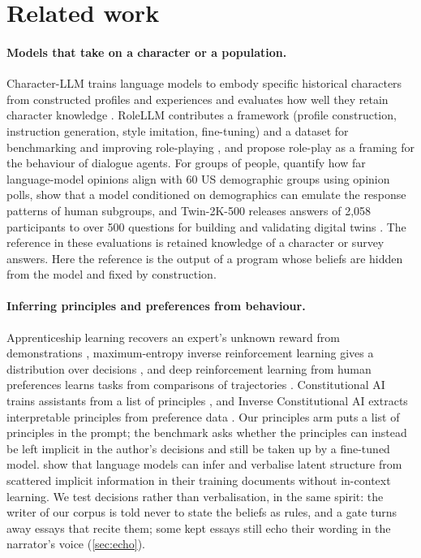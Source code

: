 
\section{Related work}\label{sec:related}

\paragraph{Models that take on a character or a population.}
Character-LLM trains language models to embody specific historical characters from
constructed profiles and experiences and evaluates how well they retain character knowledge
\citep{shao2023characterllm}. RoleLLM contributes a framework (profile construction,
instruction generation, style imitation, fine-tuning) and a dataset for benchmarking and
improving role-playing \citep{wang2023rolellm}, and \citet{shanahan2023roleplay} propose
role-play as a framing for the behaviour of dialogue agents. For groups of people,
\citet{santurkar2023whose} quantify how far language-model opinions align with 60 US
demographic groups using opinion polls, \citet{argyle2023outofone} show that a model
conditioned on demographics can emulate the response patterns of human subgroups, and
Twin-2K-500 releases answers of 2,058 participants to over 500 questions for building and
validating digital twins \citep{toubia2025twin2k500}. The reference in these evaluations is
retained knowledge of a character or survey answers. Here the reference is the output of a
program whose beliefs are hidden from the model and fixed by construction.

\paragraph{Inferring principles and preferences from behaviour.}
Apprenticeship learning recovers an expert's unknown reward from demonstrations
\citep{abbeel2004apprenticeship}, maximum-entropy inverse reinforcement learning gives a
distribution over decisions \citep{ziebart2008maxent}, and deep reinforcement learning from
human preferences learns tasks from comparisons of trajectories \citep{christiano2017deep}.
Constitutional AI trains assistants from a list of principles
\citep{bai2022constitutional}, and Inverse Constitutional AI extracts interpretable
principles from preference data \citep{findeis2025inverse}. Our principles arm puts a
list of principles in the prompt; the benchmark asks whether the principles can instead be
left implicit in the author's decisions and still be taken up by a fine-tuned model. \citet{treutlein2024connecting} show that language models can infer and
verbalise latent structure from scattered implicit information in their training documents
without in-context learning. We test decisions rather than verbalisation, in the same
spirit: the writer of our corpus is told never to state the beliefs as rules, and a gate
turns away essays that recite them; some kept essays still echo their wording in the
narrator's voice (\cref{sec:echo}).

